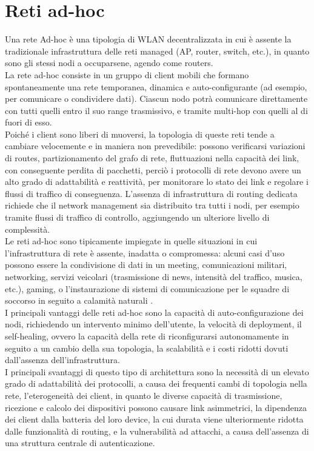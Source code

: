 \section[Reti ad-hoc]{Reti ad-hoc}
Una rete Ad-hoc è una tipologia di WLAN decentralizzata in cui è assente la tradizionale infrastruttura delle reti managed (AP, router, switch, etc.), in quanto sono gli stessi nodi a occuparsene, agendo come routers. \\
La rete ad-hoc consiste in un gruppo di client mobili che formano spontaneamente una rete temporanea, dinamica e auto-configurante (ad esempio, per comunicare o condividere dati). 
Ciascun nodo potrà comunicare direttamente con tutti quelli entro il suo range trasmissivo, e tramite multi-hop con quelli al di fuori di esso. \\
Poiché i client sono liberi di muoversi, la topologia di queste reti tende a cambiare velocemente e in maniera non prevedibile: possono verificarsi variazioni di routes, partizionamento del grafo di rete, fluttuazioni nella capacità dei link, con conseguente perdita di pacchetti, perciò i protocolli di rete devono avere un alto grado di adattabilità e reattività, per  monitorare lo stato dei link e regolare i flussi di traffico di conseguenza.
L'assenza di infrastruttura di routing dedicata richiede che il network management sia distribuito tra tutti i nodi, per esempio tramite flussi di traffico di controllo, aggiungendo un ulteriore livello di complessità. \\
Le reti ad-hoc sono tipicamente impiegate in quelle situazioni in cui l'infrastruttura di rete è assente, inadatta o compromessa: alcuni casi d'uso possono essere la condivisione di dati in un meeting, comunicazioni militari, networking, servizi veicolari (trasmissione di news, intensità del traffico, musica, etc.), gaming, o l'instaurazione di sistemi di comunicazione per le squadre di soccorso in seguito a calamità naturali \cite{7402025}. \\
I principali vantaggi delle reti ad-hoc sono la capacità di auto-configurazione dei nodi, richiedendo un intervento minimo dell'utente, la velocità di deployment, il self-healing, ovvero la capacità della rete di riconfigurarsi autonomamente in seguito a un cambio della sua topologia, la scalabilità e i costi ridotti dovuti dall'assenza dell'infrastruttura.\\
I principali svantaggi di questo tipo di architettura sono la necessità di un elevato grado di adattabilità dei protocolli, a causa dei frequenti cambi di topologia nella rete, l'eterogeneità dei client, in quanto le diverse capacità di trasmissione, ricezione e calcolo dei dispositivi possono causare link asimmetrici, la dipendenza dei client dalla batteria del loro device, la cui durata viene ulteriormente ridotta dalle funzionalità di routing, e la vulnerabilità ad attacchi, a causa dell'assenza di una struttura centrale di autenticazione. \cite{jayakumar2007ad}
